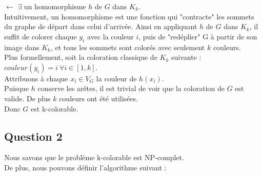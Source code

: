 $\leftarrow$ $\exists$ un homomorphisme $h$ de $G$ dans $K_k$.\\
Intuitivement, un homomorphisme est une fonction qui "contracte" les sommets du graphe de
d\'epart dans celui d'arriv\'ee. Ainsi en appliquant $h$ de $G$ dans $K_k$, il suffit de
colorer chaque $y_i$ avec la couleur $i$, puis de "red\'eplier" G \`a partir de son image
dans $K_k$, et tous les sommets sont color\'es avec seulement $k$ couleurs.\\
Plus formellement, %
soit la coloration classique de $K_k$ suivante :
$couleur(y_i) = i\ \forall i \in [1,k]$.\\
Attribuons \`a chaque $x_i \in V_G$ la couleur de $h(x_i)$.\\
Puisque $h$ conserve les ar\^etes, il est trivial de voir que la coloration de $G$ est
valide. De plus $k$ couleurs ont \'et\'e utilis\'ees.\\
Donc $G$ est k-colorable.


\subsection{Question 2}\label{ex21_q2}
Nous savons que le probl\`eme k-colorable est NP-complet.\\
De plus, nous pouvons d\'efinir l'algorithme suivant :

